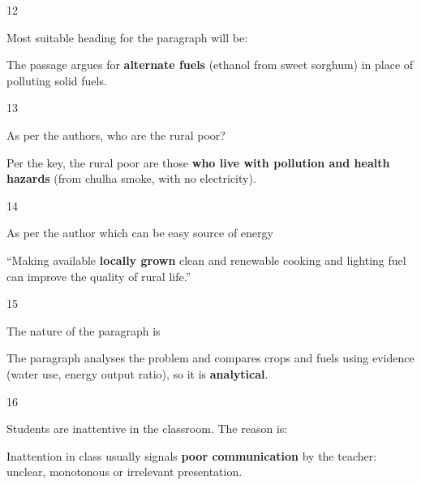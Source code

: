 \begin{question}{12}
{Most suitable heading for the paragraph will be:\par}
\begin{explain}
The passage argues for \textbf{alternate fuels} (ethanol from sweet sorghum) in place of polluting solid fuels.
\end{explain}
\end{question}

\begin{question}{13}
{As per the authors, who are the rural poor?\par}
\begin{explain}
Per the key, the rural poor are those \textbf{who live with pollution and health hazards} (from chulha smoke, with no electricity).
\end{explain}
\end{question}

\begin{question}{14}
{As per the author which can be easy source of energy\par}
\begin{explain}
``Making available \textbf{locally grown} clean and renewable cooking and lighting fuel can improve the quality of rural life.''
\end{explain}
\end{question}

\begin{question}{15}
{The nature of the paragraph is\par}
\begin{explain}
The paragraph analyses the problem and compares crops and fuels using evidence (water use, energy output ratio), so it is \textbf{analytical}.
\end{explain}
\end{question}

\begin{question}{16}
{Students are inattentive in the classroom. The reason is:\par}
\begin{explain}
Inattention in class usually signals \textbf{poor communication} by the teacher: unclear, monotonous or irrelevant presentation.
\end{explain}
\end{question}

